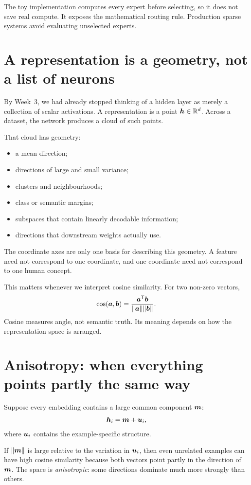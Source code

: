 The toy implementation computes every expert before selecting, so it does not save real compute. It exposes the mathematical routing rule. Production sparse systems avoid evaluating unselected experts.

\section{A representation is a geometry, not a list of neurons}

By Week~3, we had already stopped thinking of a hidden layer as merely a collection of scalar activations. A representation is a point \(\bm{h}\in\mathbb{R}^d\). Across a dataset, the network produces a cloud of such points.

That cloud has geometry:
\begin{itemize}[leftmargin=*]
  \item a mean direction;
  \item directions of large and small variance;
  \item clusters and neighbourhoods;
  \item class or semantic margins;
  \item subspaces that contain linearly decodable information;
  \item directions that downstream weights actually use.
\end{itemize}

The coordinate axes are only one basis for describing this geometry. A feature need not correspond to one coordinate, and one coordinate need not correspond to one human concept.

This matters whenever we interpret cosine similarity. For two non-zero vectors,
\[
  \cos(\bm{a},\bm{b})
  = \frac{\bm{a}^{\mathsf T}\bm{b}}
  {\lVert\bm{a}\rVert\lVert\bm{b}\rVert}.
\]
Cosine measures angle, not semantic truth. Its meaning depends on how the representation space is arranged.

\section{Anisotropy: when everything points partly the same way}

Suppose every embedding contains a large common component \(\bm{m}\):
\[
  \bm{h}_i = \bm{m} + \bm{u}_i,
\]
where \(\bm{u}_i\) contains the example-specific structure.

If \(\lVert\bm{m}\rVert\) is large relative to the variation in \(\bm{u}_i\), then even unrelated examples can have high cosine similarity because both vectors point partly in the direction of \(\bm{m}\). The space is \emph{anisotropic}: some directions dominate much more strongly than others.

